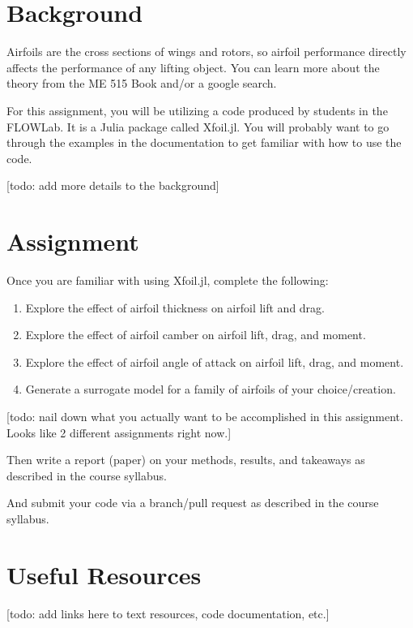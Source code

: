 \documentclass[12pt]{article}
\begin{document}
	
	\section{Background}
	
	Airfoils are the cross sections of wings and rotors, so airfoil performance directly affects the performance of any lifting object.
	You can learn more about the theory from the ME 515 Book and/or a google search.
	
	For this assignment, you will be utilizing a code produced by students in the FLOWLab.
	It is a Julia package called Xfoil.jl.
	You will probably want to go through the examples in the documentation to get familiar with how to use the code.
	
	[todo: add more details to the background]
	
	\section{Assignment}
	Once you are familiar with using Xfoil.jl, complete the following:
	
	\begin{enumerate}
		\item Explore the effect of airfoil thickness on airfoil lift and drag. 
		\item Explore the effect of airfoil camber on airfoil lift, drag, and moment.
		\item Explore the effect of airfoil angle of attack on airfoil lift, drag, and moment.
		\item Generate a surrogate model for a family of airfoils of your choice/creation.
	\end{enumerate}
	[todo: nail down what you actually want to be accomplished in this assignment.  Looks like 2 different assignments right now.]
	
	\noindent Then write a report (paper) on your methods, results, and takeaways as described in the course syllabus.
	
	\bigskip
	
	\noindent And submit your code via a branch/pull request as described in the course syllabus.
	
	\section{Useful Resources}
	
	[todo: add links here to text resources, code documentation, etc.]
	
\end{document}
